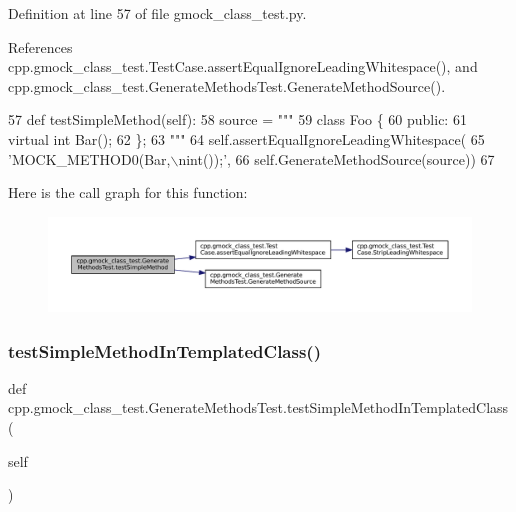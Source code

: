 Definition at line 57 of file gmock\+\_\+class\+\_\+test.\+py.



References cpp.\+gmock\+\_\+class\+\_\+test.\+Test\+Case.\+assert\+Equal\+Ignore\+Leading\+Whitespace(), and cpp.\+gmock\+\_\+class\+\_\+test.\+Generate\+Methods\+Test.\+Generate\+Method\+Source().


\begin{DoxyCode}
57   \textcolor{keyword}{def }testSimpleMethod(self):
58     source = \textcolor{stringliteral}{"""}
59 \textcolor{stringliteral}{class Foo \{}
60 \textcolor{stringliteral}{ public:}
61 \textcolor{stringliteral}{  virtual int Bar();}
62 \textcolor{stringliteral}{\};}
63 \textcolor{stringliteral}{"""}
64     self.assertEqualIgnoreLeadingWhitespace(
65         \textcolor{stringliteral}{'MOCK\_METHOD0(Bar,\(\backslash\)nint());'},
66         self.GenerateMethodSource(source))
67 
\end{DoxyCode}
Here is the call graph for this function\+:
\nopagebreak
\begin{figure}[H]
\begin{center}
\leavevmode
\includegraphics[width=350pt]{classcpp_1_1gmock__class__test_1_1GenerateMethodsTest_a3ece43a88823e3fe1b4731819505bd61_cgraph}
\end{center}
\end{figure}
\mbox{\label{classcpp_1_1gmock__class__test_1_1GenerateMethodsTest_a964a1b55f2096edf7a6165734b1f0619}} 
\subsubsection{\texorpdfstring{test\+Simple\+Method\+In\+Templated\+Class()}{testSimpleMethodInTemplatedClass()}}
{\footnotesize\ttfamily def cpp.\+gmock\+\_\+class\+\_\+test.\+Generate\+Methods\+Test.\+test\+Simple\+Method\+In\+Templated\+Class (\begin{DoxyParamCaption}\item[{}]{self }\end{DoxyParamCaption})}




